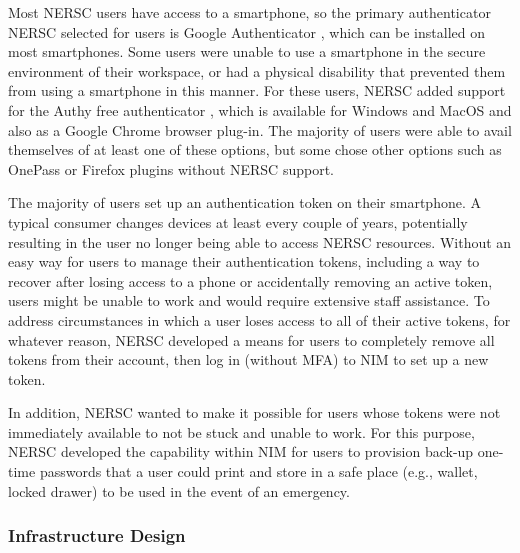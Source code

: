 \documentclass[sigconf,review]{acmart}
\begin{document}
Most NERSC users have access to a smartphone, so the primary authenticator NERSC
selected for users is Google Authenticator \cite{gauth}, which can be installed
on most smartphones. Some users were unable to use a smartphone in the secure
environment of their workspace, or had a physical disability that prevented them
from using a smartphone in this manner. For these users, NERSC added support for
the Authy free authenticator \cite{authy}, which is available for Windows and
MacOS and also as a Google Chrome browser plug-in. The majority of users were
able to avail themselves of at least one of these options, but some chose other
options such as OnePass or Firefox plugins without NERSC support.

The majority of users set up an authentication token on their smartphone. A
typical consumer changes devices at least every couple of years, potentially
resulting in the user no longer being able to access NERSC resources. Without an
easy way for users to manage their authentication tokens, including a way to
recover after losing access to a phone or accidentally removing an active token,
users might be unable to work and would require extensive staff assistance. To
address circumstances in which a user loses access to all of their active
tokens, for whatever reason, NERSC developed a means for users to completely
remove all tokens from their account, then log in (without MFA) to NIM to set up
a new token.

In addition, NERSC wanted to make it possible for users whose tokens were not
immediately available to not be stuck and unable to work. For this purpose,
NERSC developed the capability within NIM for users to provision back-up
one-time passwords that a user could print and store in a safe place (e.g.,
wallet, locked drawer) to be used in the event of an emergency.

\subsubsection{Infrastructure Design}
\label{infra}
\end{document}
